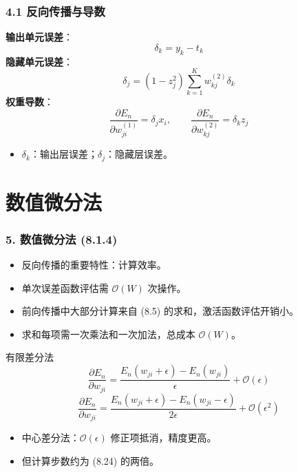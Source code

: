 \documentclass[t,aspectratio=169]{beamer} %
\begin{document}
\begin{frame}
    \frametitle{4.1 反向传播与导数}
    \textbf{输出单元误差}：
    \begin{equation}
        \delta_k = y_k - t_k
        \tag{8.21}
    \end{equation}
    \textbf{隐藏单元误差}：
    \begin{equation}
        \delta_j = (1 - z_j^2) \sum_{k=1}^K w_{kj}^{(2)} \delta_k
        \tag{8.22}
    \end{equation}
    \textbf{权重导数}：
    \begin{equation}
        \frac{\partial E_n}{\partial w_{ji}^{(1)}} = \delta_j x_i, \qquad \frac{\partial E_n}{\partial w_{kj}^{(2)}} = \delta_k z_j
        \tag{8.23}
    \end{equation}
    \begin{itemize}
        \item $\delta_k$：输出层误差；$\delta_j$：隐藏层误差。
    \end{itemize}
\end{frame}

\section{数值微分法}

\begin{frame}
    \frametitle{5. 数值微分法 (8.1.4)}
    \begin{itemize}
        \item 反向传播的重要特性：\alert{计算效率}。
        \item 单次误差函数评估需 $\mathcal{O}(W)$ 次操作。
        \item 前向传播中大部分计算来自 (8.5) 的求和，激活函数评估开销小。
        \item 求和每项需一次乘法和一次加法，总成本 $\mathcal{O}(W)$。
    \end{itemize}
    \begin{block}{有限差分法}
        \begin{equation}
            \frac{\partial E_n}{\partial w_{ji}} = \frac{E_n(w_{ji} + \epsilon) - E_n(w_{ji})}{\epsilon} + \mathcal{O}(\epsilon)
            \tag{8.24}
        \end{equation}
        \begin{equation}
            \frac{\partial E_n}{\partial w_{ji}} = \frac{E_n(w_{ji} + \epsilon) - E_n(w_{ji} - \epsilon)}{2\epsilon} + \mathcal{O}(\epsilon^2)
            \tag{8.25}
        \end{equation}
        \begin{itemize}
            \item 中心差分法：$\mathcal{O}(\epsilon)$ 修正项抵消，精度更高。
            \item 但计算步数约为 (8.24) 的\alert{两倍}。
        \end{itemize}
    \end{block}
\end{frame}
\end{document}
